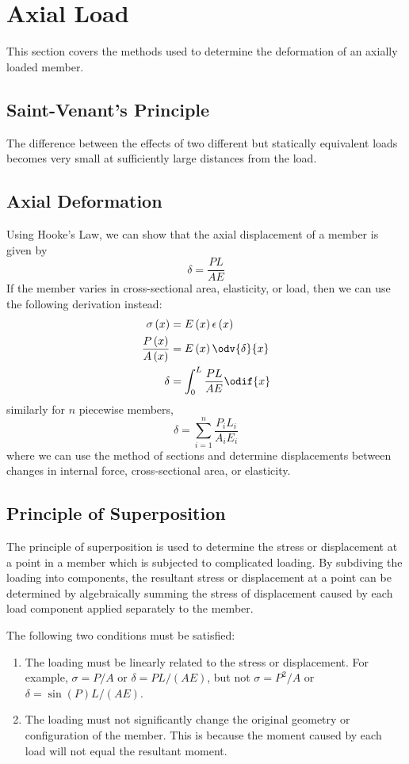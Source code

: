 \documentclass{article}
\begin{document}
\section{Axial Load}
This section covers the methods used to determine the deformation of an axially loaded member.
\subsection{Saint-Venant's Principle}
The difference between the effects of two different but statically
equivalent loads becomes very small at sufficiently large distances from the load.
\subsection{Axial Deformation}
Using Hooke's Law, we can show that the axial displacement of a member is given by
\begin{equation*}
    \delta = \frac{P L}{A E}
\end{equation*}
If the member varies in cross-sectional area, elasticity, or load, then we can use the following derivation instead:
\begin{align*}
    \sigma\left( x \right)                      & = E\left( x \right) \epsilon\left( x \right) \\
    \frac{P\left( x \right)}{A\left( x \right)} & = E\left( x \right) \odv{\delta}{x}          \\
    \delta                                      & = \int_0^L \frac{P L}{A E} \odif{x}
\end{align*}
similarly for \(n\) piecewise members,
\begin{equation*}
    \delta = \sum_{i = 1}^n \frac{P_i L_i}{A_i E_i}
\end{equation*}
where we can use the method of sections and determine displacements
between changes in internal force, cross-sectional area, or elasticity.
\subsection{Principle of Superposition}
The principle of superposition is used to determine the stress or displacement
at a point in a member which is subjected to complicated loading.
By subdiving the loading into components, the resultant stress or displacement at a point
can be determined by algebraically summing the stress of displacement caused by each
load component applied separately to the member.

The following two conditions must be satisfied:
\begin{enumerate}
    \item The loading must be linearly related to the stress or displacement.
          For example, \(\sigma = P/A\) or \(\delta = PL/\left( AE \right)\),
          but not \(\sigma = P^2/A\) or \(\delta = \sin{\left( P \right)}L/\left( AE \right)\).
    \item The loading must not significantly change the original geometry or
          configuration of the member. This is because the moment
          caused by each load will not equal the resultant moment.
\end{enumerate}
\end{document}
